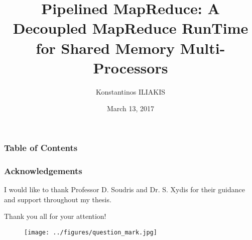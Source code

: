 \documentclass{beamer}
\title[Pipelined MapReduce]{Pipelined MapReduce: A Decoupled MapReduce RunTime for Shared Memory Multi-Processors} %
\author{Konstantinos ILIAKIS} %
\institute[NTUA] %
{
National Technical University of Athens \\ %
\medskip
\textit{iliakiskostis@gmail.com} %

\begin{figure}[h]
	\begin{subfigure}{.3\textwidth}
		\centering
		\texttt{[image: ../figures/mlab\_logo.jpg]}
	\end{subfigure}
	\hspace{2cm}
	\begin{subfigure}{.15\textwidth}
		\centering
		\texttt{[image: ../figures/ntua\_logo.jpg]}
	\end{subfigure}
	
	
\end{figure}
}
\date{March 13, 2017} %
\begin{document}
\begin{frame}
\titlepage %
\end{frame}

\begin{frame}
\frametitle{Table of Contents} %
\tableofcontents
\end{frame}


%


%	


\begin{frame}
	\frametitle{Acknowledgements}
	I would like to thank Professor D. Soudris and Dr. S. Xydis for their guidance and support throughout my thesis.
	\par\vspace{10pt}
	\centerline{Thank you all for your attention!}
	\begin{figure}[h]
		\centering
		\texttt{[image: ../figures/question\_mark.jpg]}
	\end{figure}
\end{frame}

\end{document}
